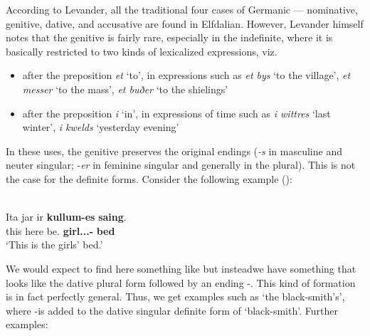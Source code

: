 According to Levander, all the traditional four cases of Germanic — nominative, genitive, dative, and accusative are found in Elfdalian. However, Levander himself notes that the genitive is fairly rare, especially in the indefinite, where it is basically restricted to two kinds of lexicalized expressions, viz. 

\begin{itemize}
\item after the preposition \textit{et} ‘to’, in expressions such as \textit{et bys} ‘to the village’, \textit{et messer} ‘to the mass’, \textit{et buðer} ‘to the shielings’
\item after the preposition \textit{i} ‘in’, in expressions of time such as \textit{i wittres} ‘last winter’, \textit{i kwelds }‘yesterday evening’
\end{itemize}



In these uses, the genitive preserves the original endings (\textit{\nobreakdash-s }in masculine and neuter singular; \nobreakdash-\textit{er} in feminine singular and generally in the plural). This is not the case for the definite forms. Consider the following example (\citet[96]{Levander1909}):


\ea\label{}
\\
\gll Ita  jar  ir  \textbf{kullum-es} \textbf{saing}.\\
this  here  be.{\prs}  \textbf{girl.{}.{\pl}.{\dat}-{\poss}} \textbf{bed}\\
\glt ‘This is the girls’ bed.’
\z

We would expect to find here something like but instead\textstyleLinguisticExample{ }we have something that looks like the dative plural form  followed by an ending \nobreakdash-. This kind of formation is in fact perfectly general. Thus, we get examples such as  ‘the black-smith’s’, where \nobreakdash-is added to the dative singular definite form  of  ‘black-smith’. Further examples:

